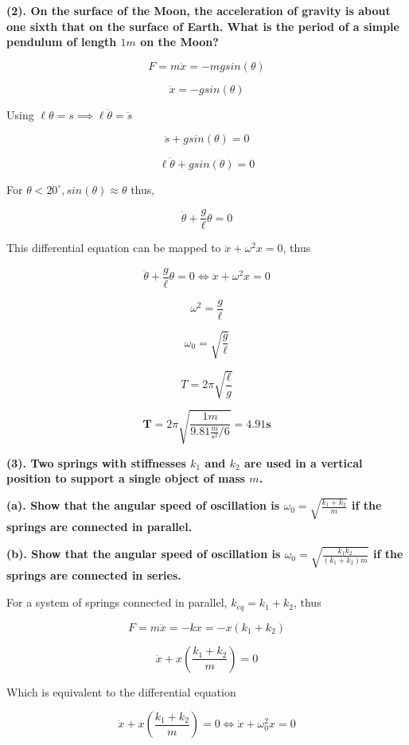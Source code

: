 \documentclass[12pt]{article}
\begin{document}
\newpage
\textbf{
(2). On the surface of the Moon, the acceleration of gravity is about one sixth that on the surface of Earth. What is the period of a simple pendulum of length $1 m$ on the Moon?
}

$$
F = m \ddot{x} = - mg sin(\theta)
$$

$$
\ddot{x} = -g sin(\theta)
$$

Using $\ell \theta = s \implies \ell \ddot{\theta} = \ddot{s}$

$$
\ddot{s} + g sin(\theta) = 0
$$

$$
\ell \ddot{\theta} + gsin(\theta) = 0
$$

For $\theta < 20^{\circ}, sin(\theta) \approx \theta$ thus,

$$
\ddot{\theta} + \frac{g}{\ell} \theta = 0
$$

This differential equation can be mapped to $\ddot{x} + \omega^2 x = 0$, thus

$$
\ddot{\theta} + \frac{g}{\ell} \theta = 0 \Longleftrightarrow \ddot{x} + \omega^2 x = 0
$$

$$\omega^2 = \frac{g}{\ell}$$



$$
\omega_0 = \sqrt{\frac{g}{\ell}}
$$

$$
T = 2 \pi \sqrt{\frac{\ell}{g}}
$$

$$
\boldsymbol{T} = 2 \pi \sqrt{\frac{1m}{9.81 \frac{m}{s^2} / 6}} = \boldsymbol{4.91 s}
$$
\newpage

\textbf{
(3). Two springs with stiffnesses $k_1$ and $k_2$ are used in a vertical position to support a single object of mass $m$.}
\newline

\textbf{
(a). Show that the angular speed of oscillation is $\omega_0 = \sqrt{\frac{k_1 + k_2}{m}}$ if the springs are connected in parallel.
}
\newline

\textbf{
(b). Show that the angular speed of oscillation is $\omega_0 = \sqrt{\frac{k_1 k_2}{(k_1 + k_2)m}}$ if the springs are connected in series.
} \newline 

For a system of springs connected in parallel, $k_{eq} = k_1 + k_2$, thus

$$
F = m \ddot{x} = -k x = -x (k_1 + k_2)
$$

$$
\ddot{x} + x (\frac{k_1 + k_2}{m}) = 0
$$

Which is equivalent to the differential equation

$$
\ddot{x} + x (\frac{k_1 + k_2}{m}) = 0 \Longleftrightarrow \ddot{x} + \omega_0^2 x = 0
$$
\end{document}

